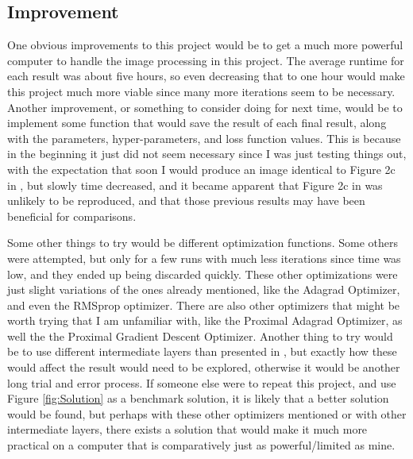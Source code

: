 \documentclass[12pt]{article}
\begin{document}
\subsection{Improvement}
One obvious improvements to this project would be to get a much more powerful computer to handle the image processing in this project. The average runtime for each result was about five hours, so even decreasing that to one hour would make this project much more viable since many more iterations seem to be necessary. Another improvement, or something to consider doing for next time, would be to implement some function that would save the result of each final result, along with the parameters, hyper-parameters, and loss function values. This is because in the beginning it just did not seem necessary since I was just testing things out, with the expectation that soon I would produce an image identical to Figure 2c in \cite{Neural}, but slowly time decreased, and it became apparent that Figure 2c in \cite{Neural} was unlikely to be reproduced, and that those previous results may have been beneficial for comparisons. 

Some other things to try would be different optimization functions. Some others were attempted, but only for a few runs with much less iterations since time was low, and they ended up being discarded quickly. These other optimizations were just slight variations of the ones already mentioned, like the Adagrad Optimizer, and even the RMSprop optimizer. There are also other optimizers that might be worth trying that I am unfamiliar with, like the Proximal Adagrad Optimizer, as well the the Proximal Gradient Descent Optimizer. Another thing to try would be to use different intermediate layers than presented in \cite{Image}, but exactly how these would affect the result would need to be explored, otherwise it would be another long trial and error process. If someone else were to repeat this project, and use Figure \ref{fig:Solution} as a benchmark solution, it is likely that a better solution would be found, but perhaps with these other optimizers mentioned or with other intermediate layers, there exists a solution that would make it much more practical on a computer that is comparatively just as powerful/limited as mine.




\newpage



\end{document}
